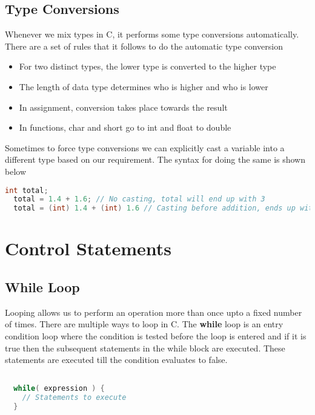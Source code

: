 \documentclass[11pt,a4paper,oneside]{book}
\begin{document}
\section{Type Conversions}
\noindent Whenever we mix types in C, it performs some type conversions automatically.
There are a set of rules that it follows to do the automatic type conversion

\begin{itemize}
  \itemsep-3pt
  \item For two distinct types, the lower type is converted to the higher type
  \item The length of data type determines who is higher and who is lower
  \item In assignment, conversion takes place towards the result
  \item In functions, char and short go to int and float to double
\end{itemize}

\noindent Sometimes to force type conversions we can explicitly cast a variable into
a different type based on our requirement. The syntax for doing the same is shown below

\begin{lstlisting}[language=C, title=Type conversion]
  int total;
  total = 1.4 + 1.6; // No casting, total will end up with 3
  total = (int) 1.4 + (int) 1.6 // Casting before addition, ends up with 2
\end{lstlisting}

\chapter{Control Statements}
\section{While Loop}
Looping allows us to perform an operation more than once upto a fixed number of times.
There are multiple ways to loop in C. The \textbf{while} loop is an entry condition loop
where the condition is tested before the loop is entered and if it is true then the 
subsequent statements in the while block are executed. These statements are executed till
the condition evaluates to false. 

\begin{lstlisting}[language=C, title=While loop]

  while( expression ) {
    // Statements to execute  
  }
\end{lstlisting}
\end{document}
